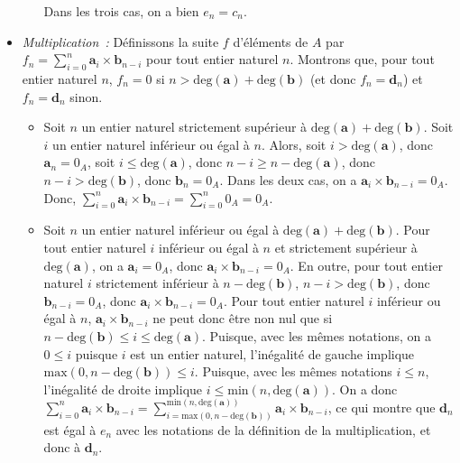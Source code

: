 \begin{itemize}[nosep]
\begin{itemize}[nosep]
\begin{itemize}[nosep]
                \end{itemize}
                Dans les trois cas, on a bien $e_n = c_n$.
        \end{itemize}
    \item \textit{Multiplication :} 
        Définissons la suite $f$ d'éléments de $A$ par $f_n = \sum_{i=0}^n \mathbf{a}_i \times \mathbf{b}_{n-i}$ pour tout entier naturel $n$.
        Montrons que, pour tout entier naturel $n$, $f_n = 0$ si $n > \mathrm{deg}(\mathbf{a}) + \mathrm{deg}(\mathbf{b})$ (et donc $f_n = \mathbf{d}_n$) et $f_n = \mathbf{d}_n$ sinon.
        \begin{itemize}[nosep]
            \item Soit $n$ un entier naturel strictement supérieur à $\mathrm{deg}(\mathbf{a}) + \mathrm{deg}(\mathbf{b})$.
                Soit $i$ un entier naturel inférieur ou égal à $n$. 
                Alors, soit $i > \mathrm{deg}(\mathbf{a})$, donc $\mathbf{a}_n = 0_A$, soit $i \leq \mathrm{deg}(\mathbf{a})$, donc $n - i \geq n - \mathrm{deg}(\mathbf{a})$, donc $n - i > \mathrm{deg}(\mathbf{b})$, donc $\mathbf{b}_n = 0_A$.
                Dans les deux cas, on a $\mathbf{a}_i \times \mathbf{b}_{n-i} = 0_A$.
                Donc, $\sum_{i=0}^n \mathbf{a}_i \times \mathbf{b}_{n-i} = \sum_{i=0}^n 0_A = 0_A$.
            \item Soit $n$ un entier naturel inférieur ou égal à $\mathrm{deg}(\mathbf{a}) + \mathrm{deg}(\mathbf{b})$.
                Pour tout entier naturel $i$ inférieur ou égal à $n$ et strictement supérieur à $\mathrm{deg}(\mathbf{a})$, on a $\mathbf{a}_i = 0_A$, donc $\mathbf{a}_i \times \mathbf{b}_{n-i} = 0_A$.
                En outre, pour tout entier naturel $i$ strictement inférieur à $n - \mathrm{deg}(\mathbf{b})$, $n - i > \mathrm{deg}(\mathbf{b})$, donc $\mathbf{b}_{n-i} = 0_A$, donc $\mathbf{a}_i \times \mathbf{b}_{n-i} = 0_A$.
                Pour tout entier naturel $i$ inférieur ou égal à $n$, $\mathbf{a}_i \times \mathbf{b}_{n-i}$ ne peut donc être non nul que si $n - \mathrm{deg}(\mathbf{b}) \leq i \leq \mathrm{deg}(\mathbf{a})$.
                Puisque, avec les mêmes notations, on a $0 \leq i$ puisque $i$ est un entier naturel, l'inégalité de gauche implique $\mathrm{max}(0, n - \mathrm{deg}(\mathbf{b})) \leq i$.
                Puisque, avec les mêmes notations $i \leq n$, l'inégalité de droite implique $i \leq \mathrm{min}(n, \mathrm{deg}(\mathbf{a}))$.
                On a donc $\sum_{i = 0}^n \mathbf{a}_i \times \mathbf{b}_{n-i} = \sum_{i = \mathrm{max}(0, n - \mathrm{deg}(\mathbf{b}))}^{\mathrm{min}(n, \mathrm{deg}(\mathbf{a}))} \mathbf{a}_i \times \mathbf{b}_{n-i}$, ce qui montre que $\mathbf{d}_n$ est égal à $e_n$ avec les notations de la définition de la multiplication, et donc à $\mathbf{d}_n$.
        \end{itemize}
\end{itemize}

